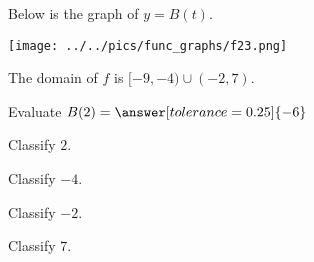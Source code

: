 \documentclass{ximera}
\author{Lee Wayand}
\begin{document}
\begin{exercise}  





Below is the graph of $y=B(t)$.  

\begin{image}
\texttt{[image: ../../pics/func\_graphs/f23.png]}
\end{image}


The domain of $f$ is $[-9, -4) \cup (-2, 7)$.\\






\begin{question} 


Evaluate $B(2) = \answer[tolerance=0.25]{-6}$



Classify $2$. \\


\begin{multipleChoice}
\end{multipleChoice}







Classify $-4$. \\


\begin{multipleChoice}
\end{multipleChoice}






Classify $-2$. \\


\begin{multipleChoice}
\end{multipleChoice}




Classify $7$. \\


\begin{multipleChoice}
\end{multipleChoice}




\end{question}











\end{exercise}
\end{document}
